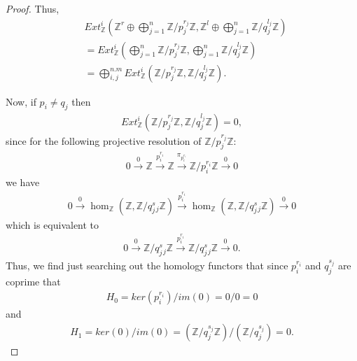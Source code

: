 \documentclass[12pt]{extarticle}
\newcommand{\Z}{\mathbb{Z}}
\newcommand{\<}{\langle}
\renewcommand{\>}{\rangle}
\theoremstyle{definition}
\begin{document}
\begin{proof}
  Thus,
  \begin{align*}
    &Ext_{\Z}^i(\Z^r \oplus \bigoplus\limits_{j=1}^n \Z/p_j^{r_j}\Z, \Z^l
    \oplus \bigoplus\limits_{j=1}^n \Z/q_j^{l_j}\Z) \\
    &= Ext_{\Z}^i(\bigoplus\limits_{j=1}^n \Z/p_j^{r_j}\Z,\bigoplus\limits_{j=1}^n \Z/q_j^{l_j}\Z) \\
    &= \bigoplus\limits_{i,j}^{n.m} Ext_{\Z}^i( \Z/p_j^{r_j}\Z, \Z/q_j^{l_j}\Z).
  \end{align*}

  Now, if $p_i \neq q_j$ then
  \begin{align*}
    Ext_{\Z}^i( \Z/p_j^{r_j}\Z, \Z/q_j^{l_j}\Z) = 0,
  \end{align*}
  since for the following projective resolution of $\Z/p_j^{r_j}\Z$:
  \begin{align*}
    0 \xrightarrow{0} \Z \xrightarrow{p_i^{r_i}} \Z \xrightarrow{\pi_{p_i^{r_i}}} \Z/p_i^{r_i}\Z \xrightarrow{0} 0
  \end{align*}
  we have
  \begin{align*}
    0 \xrightarrow{0} \hom_{\Z}(\Z, \Z/q_j^s_j\Z) \xrightarrow{p_i^{r_i}} \hom_{\Z}(\Z, \Z/q_j^s_j\Z) \xrightarrow{0} 0
  \end{align*}
  which is equivalent to
  \begin{align*}
    0 \xrightarrow{0} \Z/q_j^s_j\Z \xrightarrow{p_i^{r_i}} \Z/q_j^s_j\Z \xrightarrow{0} 0 .
  \end{align*}
  Thus, we find just searching out the homology functors that since $p_i^{r_i}$ and $q_j^{s_j}$ are coprime that
  \begin{align*}
    H_0 = ker(p_i^{r_i})/im(0) = 0/0 = 0
  \end{align*}
  and
  \begin{align*}
    H_1 = ker(0)/im(0) = (\Z/q_j^{s_j}\Z)/(\Z/q_j^{s_j}) = 0.
  \end{align*}


\end{proof}
\end{document}
